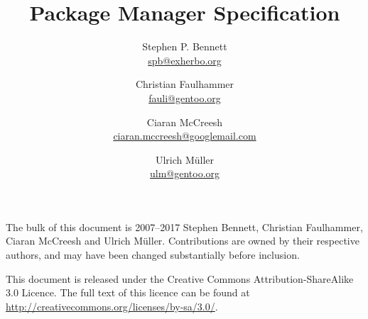 \documentclass{pms}
\title{Package Manager Specification}
\author{%
    Stephen P. Bennett \\
    \href{mailto:spb@exherbo.org}{spb@exherbo.org}
    \and
    Christian Faulhammer \\
    \href{mailto:fauli@gentoo.org}{fauli@gentoo.org}
    \and
    Ciaran McCreesh \\
    \href{mailto:ciaran.mccreesh@googlemail.com}{ciaran.mccreesh@googlemail.com}
    \and
    Ulrich Müller \\
    \href{mailto:ulm@gentoo.org}{ulm@gentoo.org}
}
\begin{document}
\maketitle

\thispagestyle{empty}
\vspace*{\fill}
{%
    \small
    The bulk of this document is \textcopyright{} 2007--2017 Stephen Bennett, Christian Faulhammer,
    Ciaran McCreesh and Ulrich Müller. Contributions are owned by their respective authors, and may
    have been changed substantially before inclusion.

    This document is released under the Creative Commons Attribution-ShareAlike 3.0 Licence. The
    full text of this licence can be found at \url{http://creativecommons.org/licenses/by-sa/3.0/}.
}

\tableofcontents
\listofalgorithms
\listoflistings
\listoftables































\appendix
\setcounter{secnumdepth}{0}





\end{document}

